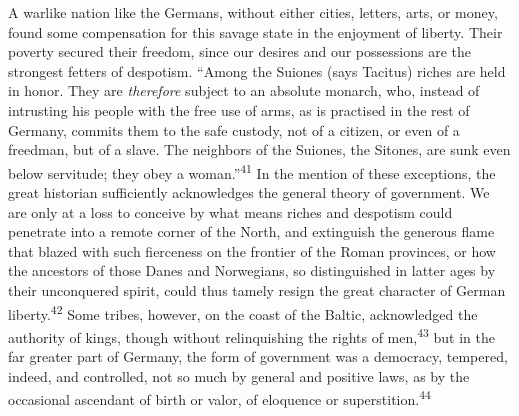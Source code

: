 


A warlike nation like the Germans, without either cities,
letters, arts, or money, found some compensation for this savage
state in the enjoyment of liberty. Their poverty secured their
freedom, since our desires and our possessions are the strongest
fetters of despotism. “Among the Suiones (says Tacitus) riches
are held in honor. They are \textit{therefore} subject to an absolute
monarch, who, instead of intrusting his people with the free use
of arms, as is practised in the rest of Germany, commits them to
the safe custody, not of a citizen, or even of a freedman, but of
a slave. The neighbors of the Suiones, the Sitones, are sunk even
below servitude; they obey a woman.”\textsuperscript{41} In the mention of these
exceptions, the great historian sufficiently acknowledges the
general theory of government. We are only at a loss to conceive
by what means riches and despotism could penetrate into a remote
corner of the North, and extinguish the generous flame that
blazed with such fierceness on the frontier of the Roman
provinces, or how the ancestors of those Danes and Norwegians, so
distinguished in latter ages by their unconquered spirit, could
thus tamely resign the great character of German liberty.\textsuperscript{42} Some
tribes, however, on the coast of the Baltic, acknowledged the
authority of kings, though without relinquishing the rights of
men,\textsuperscript{43} but in the far greater part of Germany, the form of
government was a democracy, tempered, indeed, and controlled, not
so much by general and positive laws, as by the occasional
ascendant of birth or valor, of eloquence or superstition.\textsuperscript{44}


